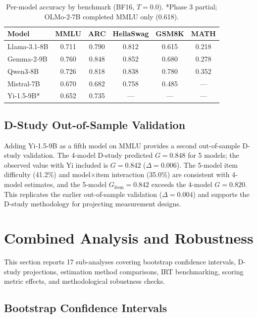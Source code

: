 \documentclass[11pt]{article}
\begin{document}
\begin{table}[t]
\centering
\caption{Per-model accuracy by benchmark (BF16, $T{=}0.0$). *Phase 3 partial; OLMo-2-7B completed MMLU only (0.618).}
\label{tab:model_accuracy}
\small
\begin{tabular}{@{}lccccc@{}}
\toprule
Model & MMLU & ARC & HellaSwag & GSM8K & MATH \\
\midrule
Llama-3.1-8B   & 0.711 & 0.790 & 0.812 & 0.615 & 0.218 \\
Gemma-2-9B     & 0.760 & 0.848 & 0.852 & 0.680 & 0.278 \\
Qwen3-8B       & 0.726 & 0.818 & 0.838 & 0.780 & 0.352 \\
Mistral-7B     & 0.670 & 0.682 & 0.758 & 0.485 & --- \\
Yi-1.5-9B*     & 0.652 & 0.735 & ---   & ---   & --- \\
\bottomrule
\end{tabular}
\end{table}

\subsection{D-Study Out-of-Sample Validation}

Adding Yi-1.5-9B as a fifth model on MMLU provides a second out-of-sample D-study validation.
The 4-model D-study predicted $G = 0.848$ for 5 models; the observed value with Yi included is $G = 0.842$ ($\Delta = 0.006$).
The 5-model item difficulty (41.2\%) and model$\times$item interaction (35.0\%) are consistent with 4-model estimates, and the 5-model $G_{\text{item}} = 0.842$ exceeds the 4-model $G = 0.820$.
This replicates the earlier out-of-sample validation ($\Delta = 0.004$) and supports the D-study methodology for projecting measurement designs.

\section{Combined Analysis and Robustness}
\label{sec:combined}

This section reports 17 sub-analyses covering bootstrap confidence intervals, D-study projections, estimation method comparisons, IRT benchmarking, scoring metric effects, and methodological robustness checks.

\subsection{Bootstrap Confidence Intervals}
\end{document}
